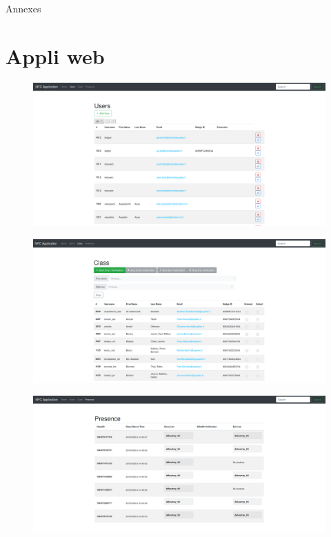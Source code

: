 \documentclass[aspectratio=169]{beamer}
\begin{document}
\begin{frame}
  \centering \Huge 
  Annexes
\end{frame}

\section{Appli web}

\begin{frame}
  \begin{figure}
    \centering
    \includegraphics[height=.9\textheight]{../assets/capture_page_users.png}
  \end{figure}
\end{frame}

\begin{frame}
  \begin{figure}
    \centering
    \includegraphics[height=.9\textheight]{../assets/capture_page_class.png}
  \end{figure}
\end{frame}

\begin{frame}
  \begin{figure}
    \centering
    \includegraphics[height=.9\textheight]{../assets/capture_page_presence.png}
  \end{figure}
\end{frame}
\end{document}
